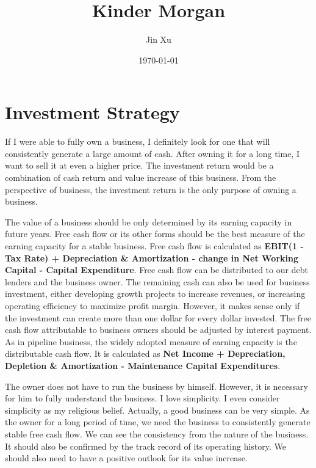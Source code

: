 \documentclass[11pt]{article}
\begin{document}
\title{Kinder Morgan}
\author{Jin Xu}
\date{\today}
\maketitle

\section{Investment Strategy}

If I were able to fully own a business, I definitely look for one that will consistently generate a large amount of cash. After owning it for a long time, I want to sell it at even a higher price. The investment return would be a combination of cash return and value increase of this business. From the perspective of business, the investment return is the only purpose of owning a business. 

The value of a business should be only determined by its earning capacity in future years. Free cash flow or its other forms should be the best measure of the earning capacity for a stable business. Free cash flow is calculated as {\bf EBIT(1 - Tax Rate) + Depreciation \& Amortization - change in Net Working Capital - Capital Expenditure}. Free cash flow can be distributed to our debt lenders and the business owner. The remaining cash can also be used for business investment, either developing growth projects to increase revenues, or increasing operating efficiency to maximize profit margin. However, it makes sense only if the investment can create more than one dollar for every dollar invested. The free cash flow attributable to business owners should be adjusted by interest payment. As in pipeline business, the widely adopted measure of earning capacity is the distributable cash flow. It is calculated as {\bf Net Income + Depreciation, Depletion \& Amortization - Maintenance Capital Expenditures}. 

The owner does not have to run the business by himself. However, it is necessary for him to fully understand the business. I love simplicity. I even consider simplicity as my religious belief. Actually, a good business can be very simple. As the owner for a long period of time, we need the business to consistently generate stable free cash flow. We can see the consistency from the nature of the business. It should also be confirmed by the track record of its operating history. We should also need to have a positive outlook for its value increase.
\end{document}
